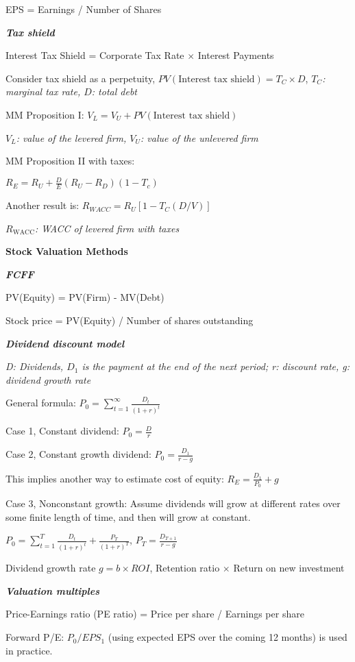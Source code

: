 \documentclass{article}
\newcommand{\bigtitle}[1]{
	\noindent
	\textbf{#1}
}
\newcommand{\smalltitle}[1]{
	\noindent
	\textbf{\textit{#1}}
}
\begin{document}
EPS = Earnings / Number of Shares



\smalltitle{Tax shield}

Interest Tax Shield = Corporate Tax Rate $\times$ Interest Payments

Consider tax shield as a perpetuity, $PV(\text{Interest tax shield}) = T_C \times D$, \textit{$T_C$: marginal tax rate, $D$: total debt}

MM Proposition I: $V_L = V_U + PV(\text{Interest tax shield})$

\textit{$V_L$: value of the levered firm, $V_U$: value of the unlevered firm}

MM Proposition II with taxes:

$R _ { E } = R _ { U } + \frac { D } { E } \left( R _ { U } - R _ { D } \right) \left( 1 - T _ { c } \right)$

Another result is: $ { R } _   { WACC }  = R _ { U } \left[ 1 - T _ { C } (  D  /   V ) \right]$

\textit{$R_{\text{WACC}}$: WACC of levered firm with taxes}

\bigtitle{Stock Valuation Methods}

\smalltitle{FCFF}

PV(Equity) = PV(Firm) - MV(Debt)

Stock price = PV(Equity) / Number of shares outstanding

\smalltitle{Dividend discount model}

\textit{D: Dividends, $D_1$ is the payment at the end of the next period; r: discount rate, g: dividend growth rate}

General formula: $P _ { 0 } = \sum _ { t = 1 } ^ { \infty } \frac { D _ { t } } { ( 1 + r ) ^ { t } }$

Case 1, Constant dividend: $P_0 = \frac{D}{r}$

Case 2, Constant growth dividend: $P_0 = \frac{D_1}{r-g} $

\noindent
This implies another way to estimate cost of equity: $R_E = \frac{D_1}{P_0}+g$

Case 3, Nonconstant growth:
Assume dividends will grow at different rates over some finite length of time, and then will grow at constant.

$P_0 = \sum \limits_{t=1}^{T} \frac{D_t}{(1+r)^t} + \frac{P_T}{(1+r)^T}$,
$P_T = \frac{D_{T+1}}{r-g}$

Dividend growth rate $g = b \times ROI$, Retention ratio $\times$ Return on new investment

\smalltitle{Valuation multiples}

Price-Earnings ratio (PE ratio) = Price per share / Earnings per share

Forward P/E: $P_0/EPS_1$ (using expected EPS over the coming 12 months) is used in practice.
\end{document}
